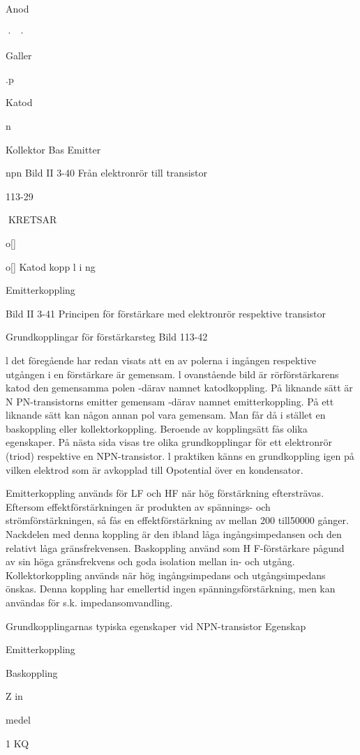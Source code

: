 Anod

·~·

Galler

.p

Katod

n

Kollektor
Bas
Emitter

npn
Bild II 3-40 Från elektronrör till transistor

113-29

KRETSAR

o[]

o[]
Katod kopp l i ng

Emitterkoppling

Bild II 3-41 Principen för förstärkare med elektronrör respektive transistor

Grundkopplingar för förstärkarsteg
Bild 113-42

l det föregående har redan visats att en av
polerna i ingången respektive utgången i en
förstärkare är gemensam. l ovanstående
bild är rörförstärkarens katod den gemensamma polen -därav namnet katodkoppling.
På liknande sätt är N PN-transistorns emitter
gemensam -därav namnet emitterkoppling.
På ett liknande sätt kan någon annan pol
vara gemensam. Man får då i stället en
baskoppling eller kollektorkoppling.
Beroende av kopplingsätt fås olika egenskaper. På nästa sida visas tre olika grundkopplingar för ett elektronrör (triod) respektive en NPN-transistor.
l praktiken känns en grundkoppling igen
på vilken elektrod som är avkopplad till Opotential över en kondensator.

Emitterkoppling används för LF och HF
när hög förstärkning eftersträvas. Eftersom
effektförstärkningen är produkten av
spännings- och strömförstärkningen, så fås
en effektförstärkning av mellan 200 till50000
gånger. Nackdelen med denna koppling är
den ibland låga ingångsimpedansen och
den relativt låga gränsfrekvensen.
Baskoppling använd som H F-förstärkare pågund av sin höga gränsfrekvens och
goda isolation mellan in- och utgång.
Kollektorkoppling används när hög ingångsimpedans och utgångsimpedans önskas. Denna koppling har emellertid ingen
spänningsförstärkning, men kan användas
för s.k. impedansomvandling.

Grundkopplingarnas typiska egenskaper vid NPN-transistor
Egenskap

Emitterkoppling

Baskoppling

Z in

medel

1 KQ

